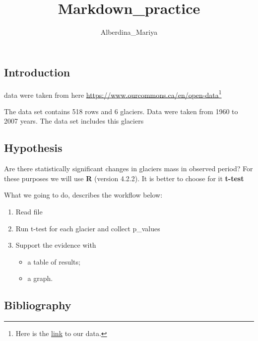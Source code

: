 \documentclass[
]{article}
\title{Markdown\_practice}
\author{Alberdina\_Mariya}
\date{}
\providecommand{\tightlist}{%
  \setlength{\itemsep}{0pt}\setlength{\parskip}{0pt}}
\begin{document}
\maketitle

{
\setcounter{tocdepth}{2}
\tableofcontents
}
\hypertarget{introduction}{%
\subsection{Introduction}\label{introduction}}

data were taken from here
\url{https://www.ourcommons.ca/en/open-data}\footnote{Here is the
  \href{https://www.ourcommons.ca/en/open-data}{link} to our data.}

The data set contains 518 rows and 6 glaciers. Data were taken from 1960
to 2007 years. The data set includes this glaciers

\hypertarget{hypothesis}{%
\subsection{Hypothesis}\label{hypothesis}}

Are there statistically significant changes in glaciers mass in observed
period? For these purposes we will use \textbf{R} (version 4.2.2). It is
better to choose for it \textbf{t-test}

What we going to do, describes the workflow below:

\begin{enumerate}
\def\labelenumi{\arabic{enumi}.}
\tightlist
\item
  Read file
\item
  Run t-test for each glacier and collect p\_values
\item
  Support the evidence with

  \begin{itemize}
  \tightlist
  \item
    a table of results;
  \item
    a graph.
  \end{itemize}
\end{enumerate}

\hypertarget{bibliography}{%
\subsection{Bibliography}\label{bibliography}}
\end{document}
